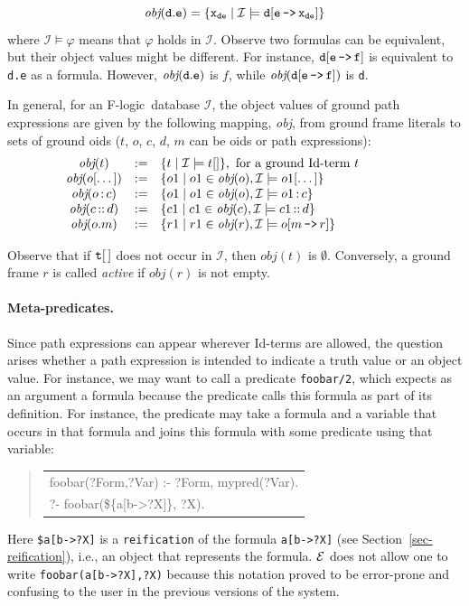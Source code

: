 \documentclass[11pt]{article}
\newcommand{\ERGO}{\mbox{\ensuremath{\cal{E}}\smaller{{\sc{RGO}}}}\xspace}
\newcommand{\FLSYSTEM}{\ERGO}
\newenvironment{qrules}{\begin{quote}\tt\begin{tabular}[t]{l}}%
{\end{tabular}\end{quote}}
\newcommand{\obj}{\textit{obj}\xspace}
\newcommand{\db}[1]{\ensuremath{\mathcal{#1}}}
\newcommand{\isa}{\,{\bf{:}}\,}
\newcommand{\subcl}{\,{\bf{::}}\,}
\newcommand{\mvd}{{\mbox{\tt \,->\,}}}  %
\newcommand{\fl}{\mbox{F-logic}\xspace}
\begin{document}
\begin{displaymath} \tt
\obj(d.e) = \{x_{de} \mid \db I \models d[e\mvd 
x_{de}]\} 
\end{displaymath}
%
where $\db I \models \varphi$ means that $\varphi$ holds in \db I.  Observe
two formulas can be equivalent, but their object values might be different.
For instance, $\tt d[e\mvd f]$ is equivalent to {\tt d.e} as a formula.
However, $\tt \obj(d.e)$ is $f$, while $\tt \obj(d[e\mvd f])$ is {\tt d}.

In general, for an \fl\ database \db I, the object values of ground path
expressions are given by the following mapping, \obj, from ground frame
literals
to sets of ground oids ($t$, $o$, $c$, $d$, $m$ can be oids or path
expressions):
%
\begin{displaymath}
  \begin{array}{cll@{\hspace{4em}}c}
    \obj(t) & := & \{t \mid  \db I\models t[] \}, 
     \textrm{ for a ground Id-term $t$}  \\   
    \obj(o[\dots]) & := & \{o1 \mid o1\in\obj(o), \db I \models o1[\dots]
    \} \\  
    \obj(o\isa c) & := & \{o1 \mid o1\in\obj(o), \db I \models o1\isa c\}
     \\ 
    \obj(c\subcl d) & := & \{c1 \mid c1\in\obj(c), \db I \models c1\subcl
    d\} \\ 
    \obj(o.m) & :=  & \{r1 \mid r1\in\obj(r), \db I \models o[m\mvd
    r]\}  
  \end{array}
\end{displaymath}

Observe that if $\tt t[\,]$ does not occur in \db{I}, then $\obj(t)$ is
$\emptyset$.  Conversely, a ground frame $r$ is called \emph{active} if
$\obj(r)$ is not empty.

\paragraph{Meta-predicates.}
Since path expressions can appear wherever Id-terms are allowed, the
question arises whether a path expression is intended to indicate a truth
value or an object value. For instance, we may want to call a
predicate {\tt foobar/2}, which expects as an argument
a formula because the predicate calls this formula as part of its definition.
For instance, the predicate may take a formula and a variable that occurs
in that formula and joins this formula with some predicate using that
variable:
\begin{qrules}
  foobar(?Form,?Var) :- ?Form, mypred(?Var).\\
  ?- foobar(\$\{a[b->?X]\}, ?X).
\end{qrules}
Here \texttt{\${a[b->?X]}} is a \texttt{reification} of the formula
\texttt{a[b->?X]} (see Section~\ref{sec-reification}), i.e., an object that
represents the formula.  \FLSYSTEM does not allow one to write
\texttt{foobar(a[b->?X],?X)} because this notation proved to be error-prone
and confusing to the user in the previous versions of the system.
\end{document}
